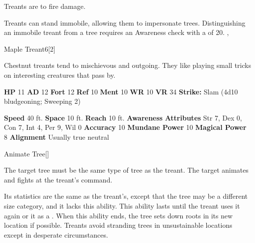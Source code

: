         Treants are  to fire damage.
      
        Treants can stand immobile, allowing them to impersonate trees.
        Distinguishing an immobile treant from a tree requires an Awareness check with a  of 20.
  ,
  \begin{monsubsection}{Maple Treant}{6}[2]
    \vspace{-1em}\vspace{-1em}
    \vspace{0em}

    
        Chestnut treants tend to mischievous and outgoing.
        They like playing small tricks on interesting creatures that pass by.
      
    

    \begin{spellcontent}
      \begin{spelltargetinginfo}
        \pari \textbf{HP} 11 \monsep
          \textbf{AD} 12 \monsep
          \textbf{Fort} 12 \monsep
          \textbf{Ref} 10 \monsep
          \textbf{Ment} 10
        \pari \textbf{WR} 10 \monsep
        \textbf{VR} 34
        \pari \textbf{Strike:}
            Slam  (4d10 bludgeoning; Sweeping 2)
      \end{spelltargetinginfo}
    \end{spellcontent}
    \begin{monsterfooter}
      \pari \textbf{Speed} 40 ft. \monsep
        \textbf{Space} 10 ft. \monsep
        \textbf{Reach} 10 ft.
      \pari \textbf{Awareness} 
      \pari \textbf{Attributes}
        Str 7, Dex 0,
        Con 7, Int 4,
        Per 9, Wil 0
      \pari \textbf{Accuracy} 10 \monsep
        \textbf{Mundane Power} 10 \monsep
      \textbf{Magical Power} 8
      \pari \textbf{Alignment} Usually true neutral
    \end{monsterfooter}
  \end{monsubsection}
  \begin{freeability}{Animate Tree}[]
      
        The target tree must be the same type of tree as the treant.
        The target animates and fights at the treant's command.

        Its statistics are the same as the treant's, except that the tree may be a different size category, and it lacks this ability.
        This ability lasts until the treant uses it again or  it as a .
        When this ability ends, the tree sets down roots in its new location if possible.
        Treants avoid stranding trees in unsustainable locations except in desperate circumstances.
      
    \end{freeability}
  
